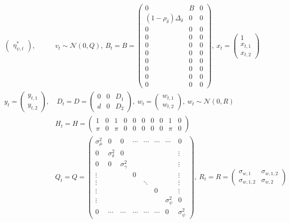 \documentclass[10pt, titlepage]{article}
\numberwithin{equation}{section}
\begin{document}
\begin{align*}
\begin{pmatrix}
        \eta_{\psi,t}^*
    \end{pmatrix} 
    , & v_t\sim\mathcal{N}(0,Q),
    \ 
    B_t = B = \begin{pmatrix}
        0 & B & 0 \\
        (1-\rho_{\delta})\Delta_{\delta} & 0 & 0 \\
        0 & 0 & 0 \\
        0 & 0 & 0 \\
        0 & 0 & 0 \\
        0 & 0 & 0 \\
        0 & 0 & 0 \\
        0 & 0 & 0 \\
        0 & 0 & 0 \\
        0 & 0 & 0
    \end{pmatrix},
    \ 
    x_t = \begin{pmatrix}
        1 \\
        x_{t,1} \\
        x_{t,2}
    \end{pmatrix} \\
    y_t = \begin{pmatrix}
        y_{t,1} \\
        y_{t,2} 
    \end{pmatrix},
    &\ 
    D_t = D = \begin{pmatrix}
        0 & 0 & D_1 \\
        d & 0 & D_2
    \end{pmatrix},
    \ 
    w_t = \begin{pmatrix}
        w_{t,1} \\
        w_{t,2}
    \end{pmatrix} 
    , \ w_t\sim\mathcal{N}(0,R) \\
    & H_t = H = \begin{pmatrix}
        1 & 0 &1 & 0 & 0 & 0 & 0 & 0 & 1 & 0 \\
        \pi & 0 & \pi & 0 & 0 & 0 & 0 & 0 & \pi & 0  
    \end{pmatrix}
    \\
    & Q_t = Q = \begin{pmatrix}
        \sigma_{\mu}^2 & 0 & 0 & \cdots & \cdots & \cdots & \cdots & 0 \\
        0 & \sigma_{\delta}^2 & 0 & & & & & \vdots \\
        0 & 0 & \sigma_{\gamma}^2 & & & & & \vdots \\
        \vdots & & & 0 & & & & \vdots \\
        \vdots & & & & \ddots & & & \vdots \\
        \vdots & & & & & 0 & & \vdots \\
        \vdots & & & & & & \sigma_{\psi}^2 & 0 \\
        0 & \cdots & \cdots & \cdots & \cdots & \cdots & 0 & \sigma_{\psi}^2
    \end{pmatrix}
    ,\ 
    R_t = R= \begin{pmatrix}
        \sigma_{w,1} & \sigma_{w,1,2} \\
        \sigma_{w,1,2} & \sigma_{w,2}
    \end{pmatrix}
\end{align*}
\end{document}
